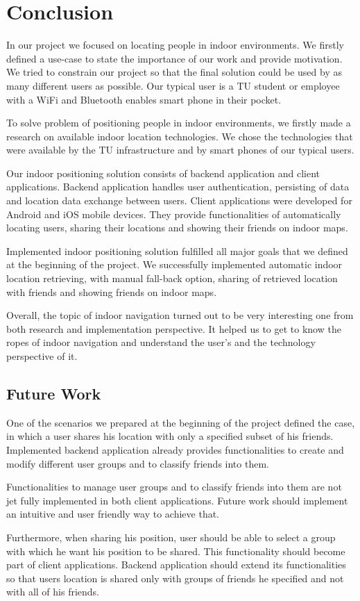 \chapter{Conclusion}
\label{cha:conclusion}

In our project we focused on locating people in indoor environments. We firstly defined a use-case to state the importance of our work and provide motivation. We tried to constrain our project so that the final solution could be used by as many different users as possible. Our typical user is a TU student or employee with a WiFi and Bluetooth enables smart phone in their pocket. 

To solve problem of positioning people in indoor environments, we firstly made a research on available indoor location technologies. We chose the technologies that were available by the TU infrastructure and by smart phones of our typical users.

Our indoor positioning solution consists of backend application and client applications. Backend application handles user authentication, persisting of data and location data exchange between users. Client applications were developed for Android and iOS mobile devices. They provide functionalities of automatically locating users, sharing their locations and showing their friends on indoor maps. 

Implemented indoor positioning solution fulfilled all major goals that we defined at the beginning of the project. We successfully implemented automatic indoor location retrieving, with manual fall-back option, sharing of retrieved location with friends and showing friends on indoor maps.

Overall, the topic of indoor navigation turned out to be very interesting one from both research and implementation perspective. It helped us to get to know the ropes of indoor navigation and understand the user's and the technology perspective of it.

\vspace{0.5cm}

\section{Future Work}

One of the scenarios we prepared at the beginning of the project defined the case, in which a user shares his location with only a specified subset of his friends. Implemented backend application already provides functionalities to create and modify different user groups and to classify friends into them. 

Functionalities to manage user groups and to classify friends into them are not jet fully implemented in both client applications. Future work should implement an intuitive and user friendly way to achieve that.

Furthermore, when sharing his position, user should be able to select a group with which he want his position to be shared. This functionality should become part of client applications. Backend application should extend its functionalities so that users location is shared only with groups of friends he specified and not with all of his friends.
